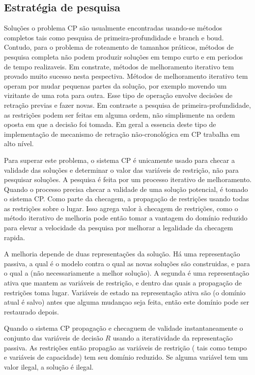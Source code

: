\documentclass[a4paper, 12pt]{article}
\begin{document}
\subsection{Estratégia de pesquisa}

 Soluções o problema CP são usualmente encontradas usando-se métodos completos tais como pesquisa de
primeira-profundidade e branch e boud. Contudo, para o problema de roteamento de tamanhos práticos,
métodos de pesquisa completa não podem produzir soluções em tempo curto e em periodos de tempo
realizaveis. Em constrate, métodos de melhoramento iterativo tem provado muito sucesso nesta
pespectiva. Métodos de melhoramento iterativo tem operam por mudar pequenas partes da solução, por
exemplo movendo um vizitante de uma rota para outra. Esse tipo de operação envolve decisões de
retração previas e fazer novas. Em contraste a pesquisa de primeira-profundidade, as restrições
podem ser feitas em alguma ordem, não simplismente na ordem oposta em que a decisão foi tomada. Em
geral a essencia deste tipo de implementação de mecanismo de retração não-cronológica em CP trabalha
em alto nível.

 Para superar este problema, o sistema CP é unicamente usado para checar a validade das soluções e
determinar o valor das variáveis de restrição, não para pesquisar soluções. A pesquisa é feita por
um processo iterativo de melhoramento. Quando o processo precisa checar a validade de uma solução
potencial, é tomado o sistema CP. Como parte da checagem, a propagação de restrições usando todas as
restrições sobre o lugar. Isso agrega valor à checagem de restrições,  como o método iterativo de 
melhoria pode então tomar a vantagem do domínio reduzido para elevar a velocidade da pesquisa por
melhorar a legalidade da checagem rapida.

 A melhoria depende de duas representações da solução. Há uma representação passiva, a qual é o
modelo contra o qual as novas soluções são construidas, e para o qual a (não necessariamente a
melhor solução). A segunda é uma representação ativa que mantem as variáveis de restrição, e dentro
das quais a propagação de restrições toma lugar. Variáveis de estado na representação ativa são (o
domínio atual é salvo) antes  que alguma mudançao seja feita, então este domínio pode ser restaurado
depois.

 Quando o sistema CP propagação e checaguem de validade instantaneamente o conjunto das variáveis de
decisão $R$ usando a iteratividade da representação passiva. As restrições então propagão as
variáveis de restrição ( tais como tempo e variáveis de capacidade) tem seu domínio reduzido. Se
alguma variável tem um valor ilegal, a solução é ilegal.
\end{document}
